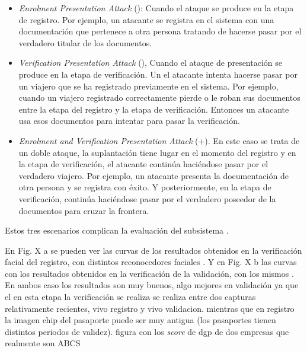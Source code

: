 \begin{itemize}
    \item
    \textit{Enrolment Presentation Attack} (): Cuando el ataque se produce en la etapa de registro. Por ejemplo, un atacante se registra en el sistema con una documentación que pertenece a otra persona tratando de hacerse pasar por el verdadero titular de los documentos.
    \item
    \textit{Verification Presentation Attack} (), Cuando el ataque de presentación se produce en la etapa de verificación. Un el atacante intenta hacerse pasar por un viajero que se ha registrado previamente en el sistema. Por ejemplo, cuando un viajero registrado correctamente pierde o le roban sus documentos entre la etapa del registro y la etapa de verificación. Entonces un atacante usa esos documentos para intentar para pasar la verificación.
    \item
    \textit{Enrolment and Verification Presentation Attack} (+). En este caso se trata de un doble ataque, la suplantación tiene lugar en el momento del registro y en la etapa de verificación, el atacante continúa haciéndose pasar por el verdadero viajero. Por ejemplo, un atacante presenta la documentación de otra persona y se registra con éxito. Y posteriormente, en la etapa de verificación, continúa haciéndose pasar por el verdadero poseedor de la documentos para cruzar la frontera.
\end{itemize}

Estos tres escenarios complican la evaluación del subsistema .

En Fig. X a se pueden ver las curvas  de los resultados obtenidos en la verificación facial del registro, con distintos reconocedores faciales . Y en Fig. X b las curvas con los resultados obtenidos en la verificación  de la validación, con los mismos . En ambos caso los resultados son muy buenos, algo mejores en validación ya que el en esta etapa la verificación se realiza se realiza entre dos capturas relativamente recientes, \gls{vivo registro} y \gls{vivo validacion}. mientras que en registro la imagen \gls{chip} del pasaporte puede ser muy antigua (los pasaportes tienen distintos periodos de validez).
\color{red}figura con los \textit{score} de dgp de dos empresas que realmente son ABCS\color{black}

